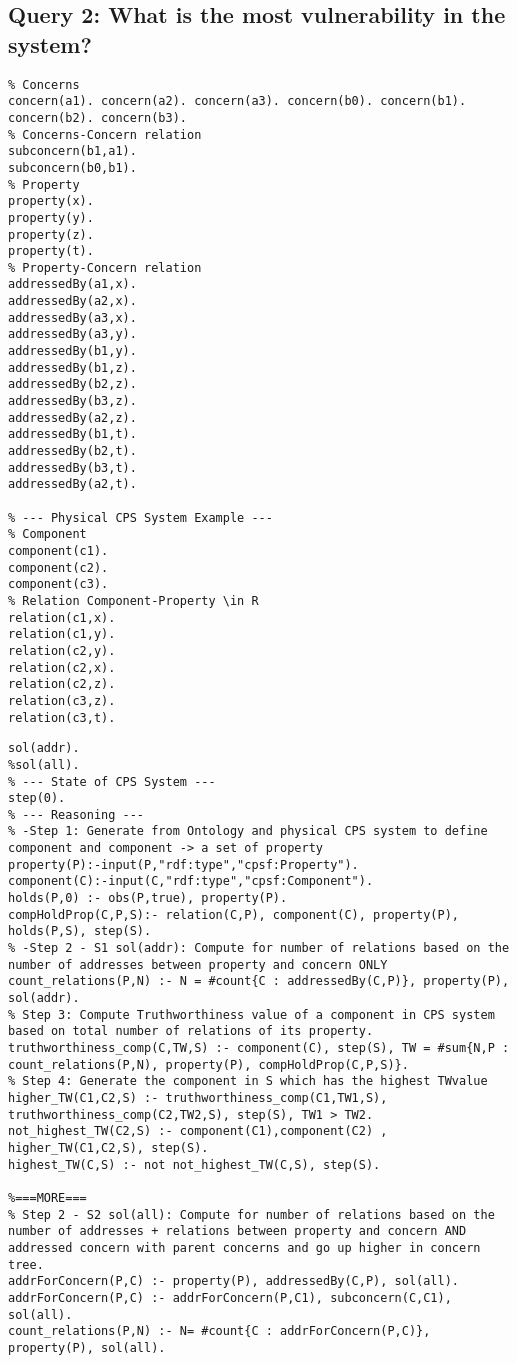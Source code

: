 \subsection{Query 2: What is the most vulnerability in the system?}
%
\begin{lstlisting}[language=clingo,caption=Example for Ontology and Physical CPS System, label=lst:q_2_ontology, mathescape=true,xleftmargin=.01\textwidth, breaklines=true]
% --- CPS Ontology Example --- 
% Concerns
concern(a1). concern(a2). concern(a3). concern(b0). concern(b1). concern(b2). concern(b3).
% Concerns-Concern relation
subconcern(b1,a1).
subconcern(b0,b1).
% Property
property(x).
property(y).
property(z).
property(t).
% Property-Concern relation
addressedBy(a1,x).
addressedBy(a2,x).
addressedBy(a3,x).
addressedBy(a3,y).
addressedBy(b1,y).
addressedBy(b1,z).
addressedBy(b2,z).
addressedBy(b3,z).
addressedBy(a2,z).
addressedBy(b1,t).
addressedBy(b2,t).
addressedBy(b3,t).
addressedBy(a2,t).

% --- Physical CPS System Example ---
% Component
component(c1).
component(c2).
component(c3).
% Relation Component-Property \in R
relation(c1,x).
relation(c1,y).
relation(c2,y).
relation(c2,x).
relation(c2,z).
relation(c3,z).
relation(c3,t).
\end{lstlisting}
%
\begin{lstlisting}[language=clingo,caption=Reasoning for Truthworthiness aspect, label=lst:q_2_truthworthiness_cal, mathescape=true,xleftmargin=.01\textwidth, breaklines=true]
% --- Configuration ---
sol(addr).
%sol(all).
% --- State of CPS System ---
step(0).
% --- Reasoning ---
% -Step 1: Generate from Ontology and physical CPS system to define component and component -> a set of property
property(P):-input(P,"rdf:type","cpsf:Property").
component(C):-input(C,"rdf:type","cpsf:Component").
holds(P,0) :- obs(P,true), property(P).
compHoldProp(C,P,S):- relation(C,P), component(C), property(P), holds(P,S), step(S).
% -Step 2 - S1 sol(addr): Compute for number of relations based on the number of addresses between property and concern ONLY
count_relations(P,N) :- N = #count{C : addressedBy(C,P)}, property(P), sol(addr).
% Step 3: Compute Truthworthiness value of a component in CPS system based on total number of relations of its property.
truthworthiness_comp(C,TW,S) :- component(C), step(S), TW = #sum{N,P : count_relations(P,N), property(P), compHoldProp(C,P,S)}.
% Step 4: Generate the component in S which has the highest TWvalue
higher_TW(C1,C2,S) :- truthworthiness_comp(C1,TW1,S), truthworthiness_comp(C2,TW2,S), step(S), TW1 > TW2.
not_highest_TW(C2,S) :- component(C1),component(C2) , higher_TW(C1,C2,S), step(S).
highest_TW(C,S) :- not not_highest_TW(C,S), step(S).

%===MORE===
% Step 2 - S2 sol(all): Compute for number of relations based on the number of addresses + relations between property and concern AND addressed concern with parent concerns and go up higher in concern tree.
addrForConcern(P,C) :- property(P), addressedBy(C,P), sol(all).
addrForConcern(P,C) :- addrForConcern(P,C1), subconcern(C,C1), sol(all).
count_relations(P,N) :- N= #count{C : addrForConcern(P,C)}, property(P), sol(all).
\end{lstlisting}
%
  
